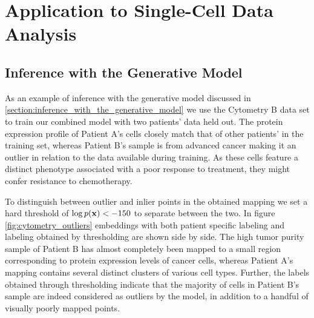 \section{Application to Single-Cell Data Analysis}
\label{section:applications}

\subsection{Inference with the Generative Model}
\label{section:application_inference_with_the_generative_model}

As an example of inference with the generative model discussed in \ref{section:inference_with_the_generative_model} we use the Cytometry B data set to train our combined model with two patients' data held out. The protein expression profile of Patient A's cells closely match that of other patients' in the training set, whereas Patient B's sample is from advanced cancer making it an outlier in relation to the data available during training. As these cells feature a distinct phenotype associated with a poor response to treatment, they might confer resistance to chemotherapy.

To distinguish between outlier and inlier points in the obtained mapping we set a hard threshold of $\log p(\mathbf{x}) < -150$ to separate between the two. In figure \ref{fig:cytometry_outliers} embeddings with both patient specific labeling and labeling obtained by thresholding are shown side by side. The high tumor purity sample of Patient B has almost completely been mapped to a small region corresponding to protein expression levels of cancer cells, whereas Patient A's mapping contains several distinct clusters of various cell types. Further, the labels obtained through thresholding indicate that the majority of cells in Patient B's sample are indeed considered as outliers by the model, in addition to a handful of visually poorly mapped points.

